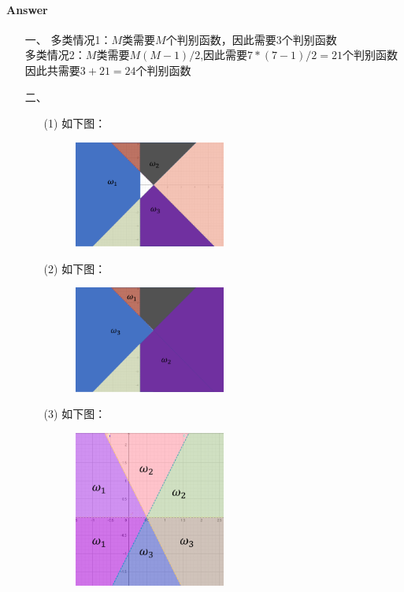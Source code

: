 \documentclass[UTF8,a4paper]{ctexart}
\begin{document}
\paragraph{Answer}
\begin{itemize}
    \item[一、] 多类情况1：$M$类需要$M$个判别函数，因此需要$3$个判别函数
    \\多类情况2：$M$类需要$M(M-1)/2$,因此需要$7*(7-1)/2 = 21$个判别函数
    \\因此共需要$3+21 = 24$个判别函数
    \item[二、] 
    \begin{itemize}
        \item[(1)] 如下图：
        \begin{figure}[H]
            \centering
            \includegraphics[width = 0.5\textwidth]{2-1.png}
            \end{figure}
        \item[(2)]如下图：
        \begin{figure}[H]
            \centering
            \includegraphics[width = 0.5\textwidth]{2-2.png}
            \end{figure}
        \item[(3)]如下图：
        \begin{figure}[H]
            \centering
            \includegraphics[width = 0.5\textwidth]{2-3.png}
            \end{figure}
    \end{itemize}


\end{itemize}
\end{document}
